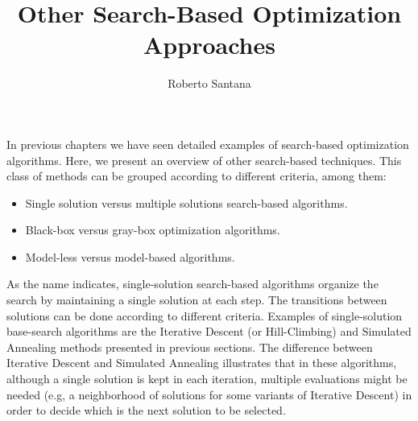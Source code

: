 \title{Other Search-Based Optimization Approaches}
\label{chp:other-search-based-optimization-approaches}
\author{Roberto Santana}
\maketitle








In previous chapters we have seen detailed examples of search-based optimization algorithms. Here, we present an overview of other search-based techniques. This class of methods can be grouped according to different criteria, among them:

 \begin{itemize}
   \item Single solution versus multiple solutions search-based algorithms.
   \item Black-box versus gray-box optimization algorithms.
    \item Model-less versus model-based algorithms.
 \end{itemize}

 As the name indicates, single-solution search-based algorithms organize the search by maintaining a single solution at each step.   The transitions between solutions can be done according to different criteria.  Examples of single-solution base-search algorithms are the Iterative Descent (or Hill-Climbing) and Simulated Annealing methods presented in previous sections. The difference between Iterative Descent  and Simulated Annealing illustrates that in these algorithms, although a single solution is kept in each iteration,  multiple evaluations might be needed (e.g, a neighborhood of solutions for some variants of Iterative Descent) in order to decide which is the next solution to be selected.

